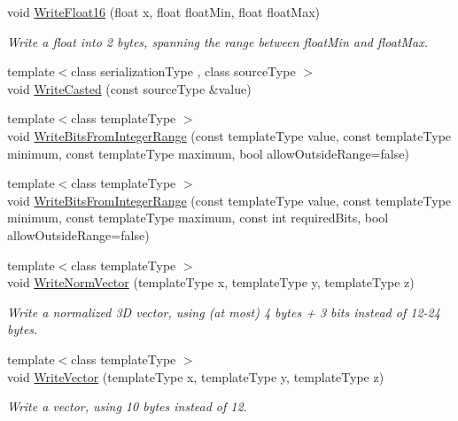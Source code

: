 \begin{DoxyCompactItemize}
\item 
void \hyperlink{class_rak_net_1_1_bit_stream_a8b37ff9ba34ce6f98c8521710ba51366}{Write\-Float16} (float x, float float\-Min, float float\-Max)
\begin{DoxyCompactList}\small\item\em Write a float into 2 bytes, spanning the range between {\itshape float\-Min} and {\itshape float\-Max}. \end{DoxyCompactList}\item 
{\footnotesize template$<$class serialization\-Type , class source\-Type $>$ }\\void \hyperlink{class_rak_net_1_1_bit_stream_a13ecfa7830db77b09a1d121bffdccb67}{Write\-Casted} (const source\-Type \&value)
\item 
{\footnotesize template$<$class template\-Type $>$ }\\void \hyperlink{class_rak_net_1_1_bit_stream_a7e9345107dfe25bfe800aa17826a77b4}{Write\-Bits\-From\-Integer\-Range} (const template\-Type value, const template\-Type minimum, const template\-Type maximum, bool allow\-Outside\-Range=false)
\item 
{\footnotesize template$<$class template\-Type $>$ }\\void \hyperlink{class_rak_net_1_1_bit_stream_a4f0064de4e5e34478bdf43623c8d41a1}{Write\-Bits\-From\-Integer\-Range} (const template\-Type value, const template\-Type minimum, const template\-Type maximum, const int required\-Bits, bool allow\-Outside\-Range=false)
\item 
{\footnotesize template$<$class template\-Type $>$ }\\void \hyperlink{class_rak_net_1_1_bit_stream_aac37adc6bd171459103131d788fdebf7}{Write\-Norm\-Vector} (template\-Type x, template\-Type y, template\-Type z)
\begin{DoxyCompactList}\small\item\em Write a normalized 3\-D vector, using (at most) 4 bytes + 3 bits instead of 12-\/24 bytes. \end{DoxyCompactList}\item 
{\footnotesize template$<$class template\-Type $>$ }\\void \hyperlink{class_rak_net_1_1_bit_stream_a0ffa67542bbe1e407a565652becb408f}{Write\-Vector} (template\-Type x, template\-Type y, template\-Type z)
\begin{DoxyCompactList}\small\item\em Write a vector, using 10 bytes instead of 12. \end{DoxyCompactList}\item 

\end{DoxyCompactItemize}
